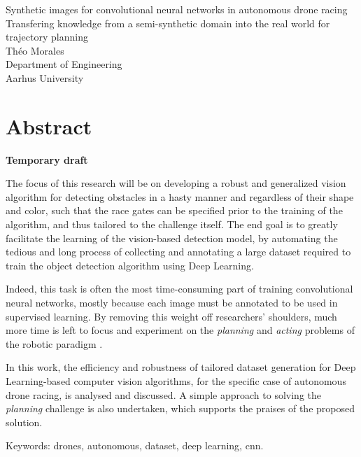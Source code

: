 Synthetic images for convolutional neural networks in autonomous
drone racing \\
Transfering knowledge from a semi-synthetic domain into the real world for
trajectory planning\\
Théo Morales\\
Department of Engineering\\
Aarhus University \setlength{\parskip}{0.5cm}

\thispagestyle{plain}			%
\setlength{\parskip}{0pt plus 1.0pt}
\section*{Abstract}

\textbf{Temporary draft}

The focus of this research will be on developing a robust and generalized
vision algorithm for detecting obstacles in a hasty manner and regardless
of their shape and color, such that the race gates can be specified prior to the
training of the algorithm, and thus tailored to the challenge itself. The end
goal is to greatly facilitate the learning of the vision-based detection model,
by automating the tedious and long process of collecting and annotating a large
dataset required to train the object detection algorithm using Deep Learning.

Indeed, this task is often the most time-consuming part of training
convolutional neural networks, mostly because each image must be annotated to be
used in supervised learning. By removing this weight off researchers' shoulders,
much more time is left to focus and experiment on the \emph{planning} and
\emph{acting} problems of the robotic paradigm .

In this work, the efficiency and robustness of tailored dataset generation for
Deep Learning-based computer vision algorithms, for the specific case of
autonomous drone racing, is analysed and discussed.
A simple approach to solving the \emph{planning} challenge is also undertaken,
which supports the praises of the proposed solution.

\vfill
Keywords: drones, autonomous, dataset, deep learning, cnn.

